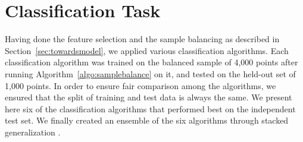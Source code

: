 \section{Classification Task}
\label{sec:classification}
Having done the feature selection and the sample balancing as described in Section~\ref{sec:towardsmodel}, we applied various classification algorithms. Each classification algorithm 
was trained on the balanced sample of 4,000 points after running Algorithm~\ref{algo:samplebalance} on it, and tested on the held-out set of 1,000 points. In order to ensure fair comparison among the algorithms, we ensured that the split of training and test data is always the same. We present here six of the classification 
algorithms that performed best on the independent test set. We finally created an ensemble of the six algorithms through stacked generalization \cite{Wolpert92}.

